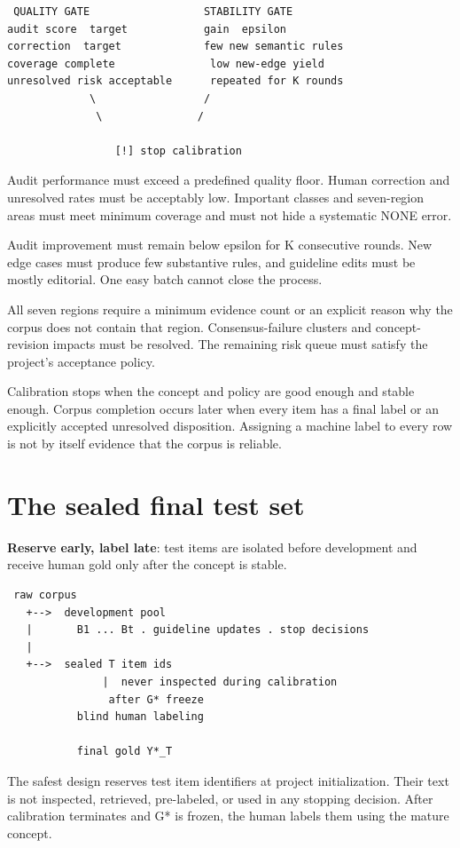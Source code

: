 \begin{verbatim}
 QUALITY GATE                  STABILITY GATE
audit score  target            gain  epsilon
correction  target             few new semantic rules
coverage complete               low new-edge yield
unresolved risk acceptable      repeated for K rounds
             \                 /
              \               /

                 [!] stop calibration
\end{verbatim}
Audit performance must exceed a predefined quality floor. Human correction and unresolved rates must be acceptably low. Important classes and seven-region areas must meet minimum coverage and must not hide a systematic NONE error.

Audit improvement must remain below epsilon for K consecutive rounds. New edge cases must produce few substantive rules, and guideline edits must be mostly editorial. One easy batch cannot close the process.

All seven regions require a minimum evidence count or an explicit reason why the corpus does not contain that region. Consensus-failure clusters and concept-revision impacts must be resolved. The remaining risk queue must satisfy the project's acceptance policy.

Calibration stops when the concept and policy are good enough and stable enough. Corpus completion occurs later when every item has a final label or an explicitly accepted unresolved disposition. Assigning a machine label to every row is not by itself evidence that the corpus is reliable.


\section{The sealed final test set}
\textbf{Reserve early, label late}: test items are isolated before development and receive human gold only after the concept is stable.

\begin{verbatim}
 raw corpus
   +-->  development pool
   |       B1 ... Bt . guideline updates . stop decisions
   |
   +-->  sealed T item ids
               |  never inspected during calibration
                after G* freeze
           blind human labeling

           final gold Y*_T
\end{verbatim}
The safest design reserves test item identifiers at project initialization. Their text is not inspected, retrieved, pre-labeled, or used in any stopping decision. After calibration terminates and G* is frozen, the human labels them using the mature concept.


